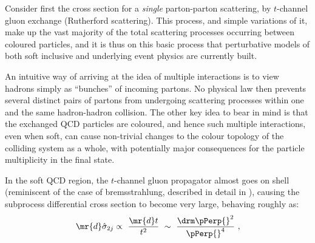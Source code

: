 
Consider first the cross section for a \emph{single} parton-parton
scattering, \eg by $t$-channel gluon exchange (Rutherford scattering).
This process, and simple variations of it, make up the vast
majority of the total scattering
processes occurring between coloured particles, and it is thus on
this basic process that perturbative models of both soft inclusive and
underlying event physics are currently built.

An intuitive way of arriving at the idea of multiple interactions
is to view hadrons simply as ``bunches'' of incoming
partons. No physical law then  prevents several distinct pairs of partons
from undergoing scattering processes within one and the same hadron-hadron
collision.  The other key idea to bear in mind is that the exchanged QCD
particles are coloured, and hence such multiple interactions, even when soft, can cause non-trivial changes to the
colour topology of the colliding system as a whole, with potentially
major consequences for the particle multiplicity in the final state.

In the soft QCD region, the $t$-channel gluon propagator almost goes
on shell (reminiscent of the case of bremsstrahlung, described in detail in
), causing the subprocess differential cross
section to become very large, behaving roughly as:
\begin{equation}
\mr{d}\hat{\sigma}_{2j} \propto \
\frac{\mr{d}t }{t^2} \ \sim \
 \frac{\drm\pPerp{}^2}{\pPerp{}^4}~, \label{eq:dpt4}
\end{equation}

